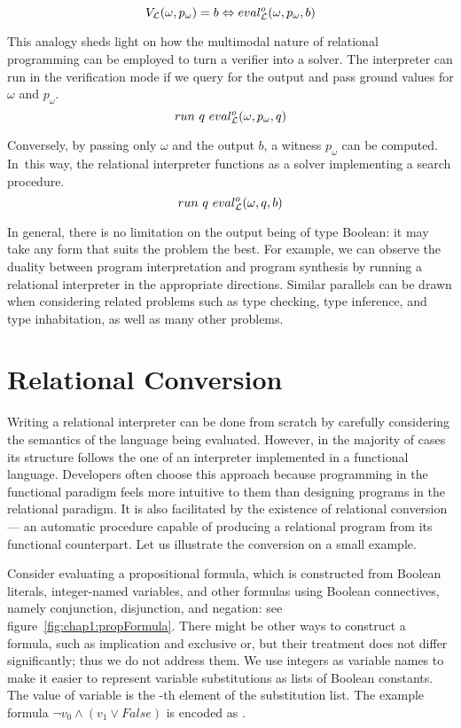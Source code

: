 \[
V_{\mathcal{L}}(\omega, p_{\omega}) = b \Leftrightarrow eval^o_{\mathcal{L}}(\omega, p_{\omega}, b)
\]

This analogy sheds light on how the multimodal nature of relational programming can be employed to turn a verifier into a solver. 
The interpreter can run in the verification mode if we query for the output and pass ground values for $\omega$ and $p_{\omega}$.  
\[ 
  run \ q \ eval^o_{\mathcal{L}}(\omega, p_{\omega}, q)
\]

Conversely, by passing only $\omega$ and the output $b$, a witness $p_{\omega}$ can be computed. 
In~this way, the relational interpreter functions as a solver implementing a search procedure. 
\[ 
  run \ q \ eval^o_{\mathcal{L}}(\omega, q, b)
\]

In general, there is no limitation on the output being of type Boolean: it may take any form that suits the problem the best. 
For example, we can observe the duality between program interpretation and program synthesis by running a relational interpreter in the appropriate directions. 
Similar parallels can be drawn when considering related problems such as type checking, type inference, and type inhabitation, as well as many other problems.

\section{Relational Conversion}

Writing a relational interpreter can be done from scratch by carefully considering the semantics of the language being evaluated. 
However, in the majority of cases its structure follows the one of an interpreter implemented in a functional language. 
Developers often choose this approach because programming in the functional paradigm feels more intuitive to them than designing programs in the relational paradigm.
It is also facilitated by the existence of relational conversion --- an automatic procedure capable of producing a relational program from its functional counterpart. 
Let us illustrate the conversion on a small example.

\begin{wrapfigure}{r}{0.43\textwidth}
  
\end{wrapfigure}

Consider evaluating a propositional formula, which is constructed from Boolean literals, integer-named variables, and other formulas using Boolean connectives, namely conjunction, disjunction, and negation: see figure~\ref{fig:chap1:propFormula}. 
There might be other ways to construct a formula, such as implication and exclusive or, but their treatment does not differ significantly; thus we do not address them. 
We use integers as variable names to make it easier to represent variable substitutions as lists of Boolean constants. 
The value of variable  is the -th element of the substitution list. 
The example formula $\neg v_0 \wedge (v_1 \vee False)$ is encoded as . 

